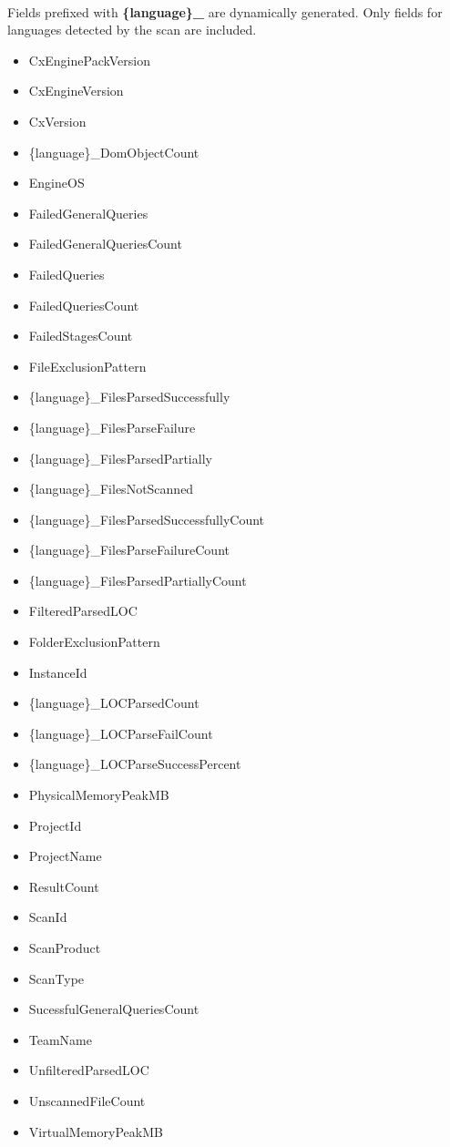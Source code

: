 \noindent\\Fields prefixed with \textbf{\{language\}\_} are dynamically generated.  Only fields for languages detected by the scan are included.

\begin{itemize}

    \item CxEnginePackVersion
    \item CxEngineVersion
    \item CxVersion
    \item \{language\}\_DomObjectCount
    \item EngineOS
    \item FailedGeneralQueries
    \item FailedGeneralQueriesCount
    \item FailedQueries
    \item FailedQueriesCount
    \item FailedStagesCount
    \item FileExclusionPattern
    \item \{language\}\_FilesParsedSuccessfully
    \item \{language\}\_FilesParseFailure
    \item \{language\}\_FilesParsedPartially
    \item \{language\}\_FilesNotScanned
    \item \{language\}\_FilesParsedSuccessfullyCount
    \item \{language\}\_FilesParseFailureCount
    \item \{language\}\_FilesParsedPartiallyCount
    \item FilteredParsedLOC
    \item FolderExclusionPattern
    \item InstanceId
    \item \{language\}\_LOCParsedCount
    \item \{language\}\_LOCParseFailCount
    \item \{language\}\_LOCParseSuccessPercent
    \item PhysicalMemoryPeakMB
    \item ProjectId
    \item ProjectName
    \item ResultCount
    \item ScanId
    \item ScanProduct
    \item ScanType
    \item SucessfulGeneralQueriesCount
    \item TeamName
    \item UnfilteredParsedLOC
    \item UnscannedFileCount
    \item VirtualMemoryPeakMB
\end{itemize}


